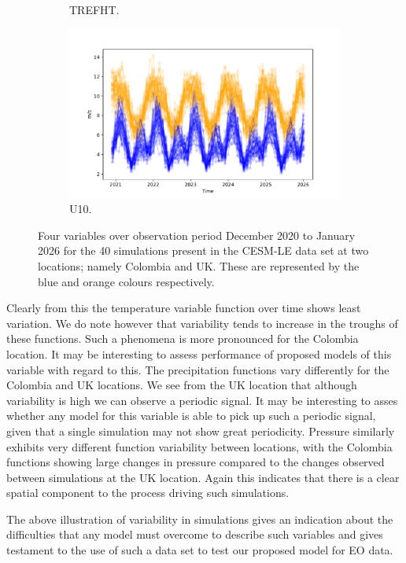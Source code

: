 \begin{figure}[htbp!]
\begin{subfigure}[b]{0.45\textwidth}
		\caption{TREFHT.}
		\label{fig:std_temp_temp}   
	\end{subfigure}             
	\begin{subfigure}[b]{0.45\textwidth}
		\includegraphics[width=\textwidth]{U10_std_temp}
		\caption{U10.}
		\label{fig:std_wind_temp}
	\end{subfigure}             
	\caption[Overview of variability of Precipitation, Pressure, Temperature, and Wind speed.]{ Four variables over observation period December 2020 to January 2026 for the 40 simulations present in the CESM-LE data set at two locations; namely Colombia and UK. These are represented by the blue and orange colours respectively.}
	\label{fig:std_overview_temp}
\end{figure}

Clearly from this the temperature variable function over time shows least variation. 
We do note however that variability tends to increase in the troughs of these functions. 
Such a phenomena is more pronounced for the Colombia location. 
It may be interesting to assess performance of proposed models of this variable with regard to this.
The precipitation functions vary differently for the Colombia and UK locations.
We see from the UK location that although variability is high we can observe a periodic signal. 
It may be interesting to asses whether any model for this variable is able to pick up such a periodic signal, given that a single simulation may not show great periodicity.
Pressure similarly exhibits very different function variability between locations, with the Colombia functions showing large changes in pressure compared to the changes observed between simulations at the UK location. 
Again this indicates that there is a clear spatial component to the process driving such simulations. 

The above illustration of variability in simulations gives an indication about the difficulties that any model must overcome to describe such variables and gives testament to the use of such a data set to test our proposed model for EO data.






